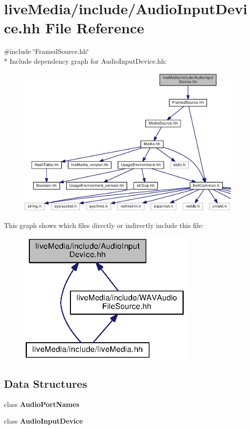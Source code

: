 \section{live\+Media/include/\+Audio\+Input\+Device.hh File Reference}
\label{AudioInputDevice_8hh}
{\ttfamily \#include \char`\"{}Framed\+Source.\+hh\char`\"{}}\\*
Include dependency graph for Audio\+Input\+Device.\+hh\+:
\nopagebreak
\begin{figure}[H]
\begin{center}
\leavevmode
\includegraphics[width=350pt]{AudioInputDevice_8hh__incl}
\end{center}
\end{figure}
This graph shows which files directly or indirectly include this file\+:
\nopagebreak
\begin{figure}[H]
\begin{center}
\leavevmode
\includegraphics[width=249pt]{AudioInputDevice_8hh__dep__incl}
\end{center}
\end{figure}
\subsection*{Data Structures}
\begin{DoxyCompactItemize}
\item 
class {\bf Audio\+Port\+Names}
\item 
class {\bf Audio\+Input\+Device}
\end{DoxyCompactItemize}
